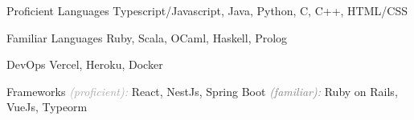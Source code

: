 

\begin{cvskills}

  \cvskill
  {Proficient Languages}
  {Typescript/Javascript, Java, Python, C, C++, HTML/CSS}

  \cvskill
  {Familiar Languages}
  {Ruby, Scala, OCaml, Haskell, Prolog}

  \cvskill
  {DevOps}
  {Vercel, Heroku, Docker}

  \cvskill
  {Frameworks}
  {\textcolor{darkgray}{\textit{(proficient):}} React, NestJs, Spring Boot \textcolor{gray}{\textit{(familiar):}} Ruby on Rails, VueJs, Typeorm}

\end{cvskills}
